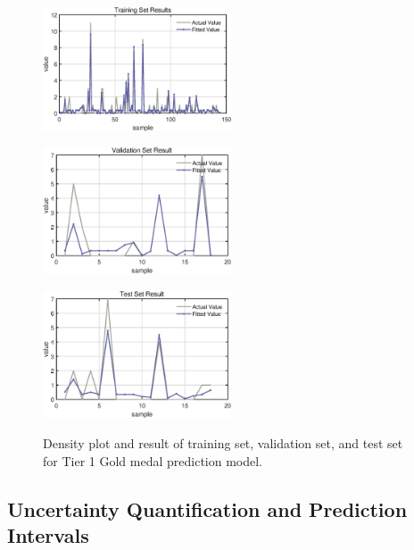 \documentclass{mcmthesis}
\begin{document}
\begin{figure}[htbp]
    \begin{minipage}[t]{0.3\textwidth}
        \centering
        \includegraphics[width=2.2in, keepaspectratio]{pics/2.eps}
        \label{fig:image4}
    \end{minipage}
    \hfill
    \begin{minipage}[t]{0.3\textwidth}
        \centering
        \includegraphics[width=2.2in, keepaspectratio]{pics/4.eps}
        \label{fig:image5}
    \end{minipage}
    \hfill
    \begin{minipage}[t]{0.3\textwidth}
        \centering
        \includegraphics[width=2.2in, keepaspectratio]{pics/6.eps}
        \label{fig:image6}
    \end{minipage}
    
    \caption{Density plot and result of training set, validation set, and test set for Tier 1 Gold medal prediction model.}

    
    \label{fig:smaller_eps_images}
\end{figure}


    

\subsection{Uncertainty Quantification and Prediction Intervals}
\end{document}
